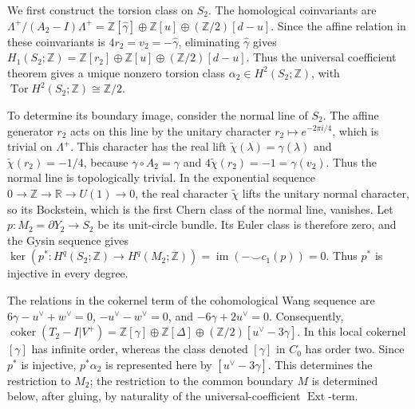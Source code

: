 \documentclass[11pt]{article}
\theoremstyle{definition}
\theoremstyle{remark}
\numberwithin{equation}{section}
\begin{document}
We first construct the torsion class on $S_2$.  The homological
coinvariants are
$\Lambda^+/(A_2-I)\Lambda^+=\mathbb Z[\widehat\gamma]\oplus\mathbb Z[u]
\oplus(\mathbb Z/2)[d-u]$.  Since the affine relation in these coinvariants
is $4r_2=v_2=-\widehat\gamma$, eliminating $\widehat\gamma$ gives
$H_1(S_2;\mathbb Z)=\mathbb Z[r_2]\oplus\mathbb Z[u]
\oplus(\mathbb Z/2)[d-u]$.  Thus the universal coefficient theorem gives a
unique nonzero torsion class
$\alpha_2\in H^2(S_2;\mathbb Z)$, with
$\operatorname{Tor}H^2(S_2;\mathbb Z)\cong\mathbb Z/2$.

To determine its boundary image, consider the normal line of $S_2$.  The
affine generator $r_2$ acts on this line by the unitary
character $r_2\mapsto e^{-2\pi i/4}$, which is trivial on $\Lambda^+$.
This character has the real lift
$\widetilde\chi(\lambda)=\gamma(\lambda)$ and
$\widetilde\chi(r_2)=-1/4$,
because $\gamma\circ A_2=\gamma$ and
$4\widetilde\chi(r_2)=-1=\gamma(v_2)$.  Thus the normal line is
topologically trivial.  In the exponential sequence
$0\to\mathbb Z\to\mathbb R\to U(1)\to0$, the real character
$\widetilde\chi$ lifts the unitary normal character, so its Bockstein,
which is the first Chern class of the normal line, vanishes.  Let
$p:M_2=\partial Y_2\to S_2$ be its unit-circle bundle.  Its Euler class is
therefore zero, and the Gysin sequence gives
$\ker(p^*:H^q(S_2;\mathbb Z)\to H^q(M_2;\mathbb Z))
=\operatorname{im}({-}\smile c_1(p))=0$.
Thus $p^*$ is injective in every degree.

The relations in the cokernel term of the cohomological Wang sequence are
$6\gamma-u^\vee+w^\vee=0$, $-u^\vee-w^\vee=0$, and
$-6\gamma+2u^\vee=0$.  Consequently,
$\operatorname{coker}(T_2-I|V^+)
=\mathbb Z[\gamma]\oplus\mathbb Z[\Delta]
\oplus(\mathbb Z/2)[u^\vee-3\gamma]$.
In this local cokernel $[\gamma]$ has infinite order, whereas the class
denoted $[\gamma]$ in $C_0$ has order two.  Since $p^*$ is injective,
$p^*\alpha_2$ is represented here by $[u^\vee-3\gamma]$.  This determines
the restriction to $M_2$; the restriction to the common boundary $M$ is
determined below, after gluing, by naturality of the universal-coefficient
$\operatorname{Ext}$-term.
\end{document}
